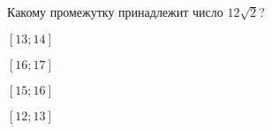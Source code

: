 \begin{ex}
	\begin{condition}
		Какому промежутку принадлежит число $12\sqrt{2}$?
		
		\selectanswer
		\begin{enumcols}[columns=4]
			\item $[13;14]$
			\item $[16;17]$
			\item $[15;16]$
			\item $[12;13]$
		\end{enumcols}
	\end{condition}
\end{ex}